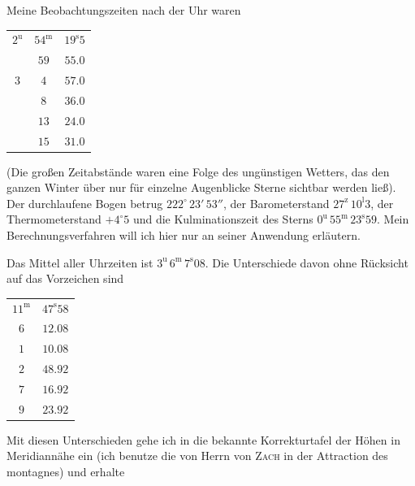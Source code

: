 \par\indent Meine Beobachtungszeiten nach der Uhr waren

\begin{center}\fontsize{10}{12}\selectfont\setlength{\tabcolsep}{3pt}\begin{tabular}{ccc}
$2^{\mathrm u}$ & $54^{\mathrm m}$ & $19^{\mathrm s}5$\\
 & $59$ & $55.0$\\
$3$ & $4$ & $57.0$\\
 & $8$ & $36.0$\\
 & $13$ & $24.0$\\
 & $15$ & $31.0$\\
\end{tabular}\end{center}

\par\indent (Die großen Zeitabstände waren eine Folge des ungünstigen Wetters, das den ganzen Winter über nur für einzelne Augenblicke Sterne sichtbar werden ließ). Der durchlaufene Bogen betrug $222^\circ\,23'\,53''$, der Barometerstand $27^{\mathrm z}\,10^{\mathrm l}3$, der Thermometerstand $+4^\circ5$ und die Kulminationszeit des Sterns $0^{\mathrm u}\,55^{\mathrm m}\,23^{\mathrm s}59$. Mein Berechnungsverfahren will ich hier nur an seiner Anwendung erläutern.

\par\indent Das Mittel aller Uhrzeiten ist $3^{\mathrm u}\,6^{\mathrm m}\,7^{\mathrm s}08$. Die Unterschiede davon ohne Rücksicht auf das Vorzeichen sind

\begin{center}\fontsize{10}{12}\selectfont\setlength{\tabcolsep}{3pt}\begin{tabular}{cc}
$11^{\mathrm m}$ & $47^{\mathrm s}58$\\
$6$ & $12.08$\\
$1$ & $10.08$\\
$2$ & $48.92$\\
$7$ & $16.92$\\
$9$ & $23.92$\\
\end{tabular}\end{center}

\par\indent Mit diesen Unterschieden gehe ich in die bekannte Korrekturtafel der Höhen in Meridiannähe ein (ich benutze die von Herrn von \textsc{Zach} in der Attraction des montagnes) und erhalte

